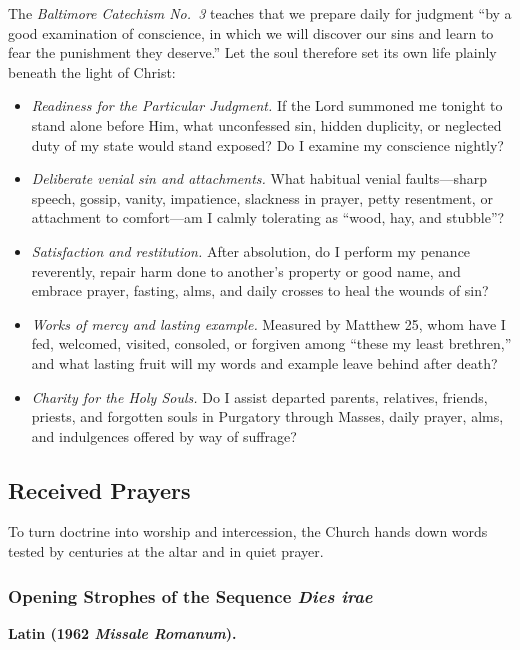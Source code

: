 The \textit{Baltimore Catechism No.\ 3} teaches that we prepare daily for judgment ``by a good examination of conscience, in which we will discover our sins and learn to fear the punishment they deserve.'' Let the soul therefore set its own life plainly beneath the light of Christ:

\begin{itemize}
\item \textit{Readiness for the Particular Judgment.} If the Lord summoned me tonight to stand alone before Him, what unconfessed sin, hidden duplicity, or neglected duty of my state would stand exposed? Do I examine my conscience nightly?
\item \textit{Deliberate venial sin and attachments.} What habitual venial faults---sharp speech, gossip, vanity, impatience, slackness in prayer, petty resentment, or attachment to comfort---am I calmly tolerating as ``wood, hay, and stubble''?
\item \textit{Satisfaction and restitution.} After absolution, do I perform my penance reverently, repair harm done to another's property or good name, and embrace prayer, fasting, alms, and daily crosses to heal the wounds of sin?
\item \textit{Works of mercy and lasting example.} Measured by Matthew 25, whom have I fed, welcomed, visited, consoled, or forgiven among ``these my least brethren,'' and what lasting fruit will my words and example leave behind after death?
\item \textit{Charity for the Holy Souls.} Do I assist departed parents, relatives, friends, priests, and forgotten souls in Purgatory through Masses, daily prayer, alms, and indulgences offered by way of suffrage?
\end{itemize}

\subsection*{Received Prayers}

To turn doctrine into worship and intercession, the Church hands down words tested by centuries at the altar and in quiet prayer.

\subsubsection*{Opening Strophes of the Sequence \textit{Dies irae}}

\textbf{Latin (1962 \textit{Missale Romanum}).}

